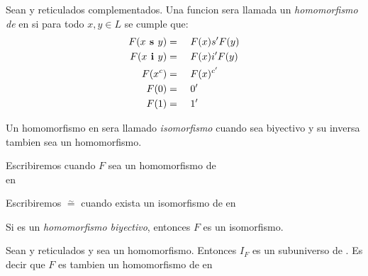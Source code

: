   \begin{definition}
    Sean \reticulCompl y  reticulados complementados. Una funcion
     sera llamada un \emph{homomorfismo de} \reticulCompl en 
    si para todo $x, y \in L$ se cumple que:
    \begin{alignat*}{4}
      F(x\textbf{ s }y) &=&\ & F(x) s' F(y)\\
      F(x\textbf{ i }y) &=&\ & F(x) i' F(y)\\
      F(x^c) &=&\ & F(x)^{c'}\\
      F(0) &=&\ & 0'\\
      F(1) &=&\ & 1'
    \end{alignat*}

    Un homomorfismo \reticulCompl en  sera llamado \emph{isomorfismo} cuando
    sea biyectivo y su inversa tambien sea un homomorfismo. 

    Escribiremos  cuando $F$ sea un homomorfismo de\\
    \reticulCompl en 

    Escribiremos \reticulCompl $\overset{\sim}{=}$  cuando exista
    un isomorfismo de \reticulCompl en 
  \end{definition}

  \begin{lemma}
    Si  es un \emph{homomorfismo biyectivo},
    entonces $F$ es un isomorfismo.
  \end{lemma}
  \noproof
  \begin{lemma}
    Sean \reticulCompl y  reticulados y sea 
    un homomorfismo. Entonces $I_F$ es un subuniverso de . Es decir que $F$
    es tambien un homomorfismo de \reticulCompl en 
  \end{lemma}
  \noproof

